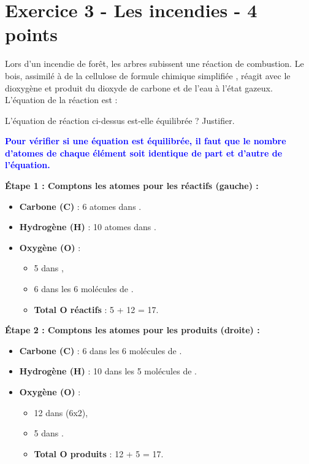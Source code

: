 \documentclass[answers]{exam}
\begin{document}
\section*{Exercice 3 - Les incendies - 4 points}

Lors d’un incendie de forêt, les arbres subissent une réaction de combustion. Le bois, assimilé à de
la cellulose de formule chimique simplifiée , réagit avec le dioxygène et produit du dioxyde
de carbone et de l’eau à l’état gazeux. L’équation de la réaction est :

\begin{center}
\end{center}

\begin{questions}
  \question[1.5] L'équation de réaction ci-dessus est-elle équilibrée ? Justifier.

  \begin{solution}
    \textcolor{blue}{\textbf{Pour vérifier si une équation est équilibrée, il faut que le nombre d'atomes de chaque élément soit identique de part et d'autre de l'équation.}}\newline

    \textbf{Étape 1 : Comptons les atomes pour les réactifs (gauche) :}
    \begin{itemize}[noitemsep]
      \item \textbf{Carbone (C)} : 6 atomes dans .
      \item \textbf{Hydrogène (H)} : 10 atomes dans .
      \item \textbf{Oxygène (O)} :
      \begin{itemize}[noitemsep]
        \item 5 dans ,
        \item 6 dans les 6 molécules de .
        \item \textbf{Total O réactifs} : 5 + 12 = 17.
      \end{itemize}
    \end{itemize}

    \textbf{Étape 2 : Comptons les atomes pour les produits (droite) :}
    \begin{itemize}[noitemsep]
      \item \textbf{Carbone (C)} : 6 dans les 6 molécules de .
      \item \textbf{Hydrogène (H)} : 10 dans les 5 molécules de .
      \item \textbf{Oxygène (O)} :
      \begin{itemize}[noitemsep]
        \item 12 dans  (6x2),
        \item 5 dans .
        \item \textbf{Total O produits} : 12 + 5 = 17.
      \end{itemize}
    \end{itemize}


\end{solution}
\end{questions}
\end{document}
